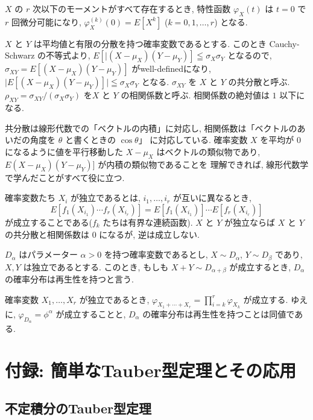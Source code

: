 \documentclass[12pt,twoside]{jarticle}
\theoremstyle{jplain}
\theoremstyle{jplain}
\theoremstyle{jplain}
\numberwithin{theorem}{section}
\numberwithin{equation}{section}
\numberwithin{figure}{section}
\numberwithin{table}{section}
\begin{document}
$X$ の $r$ 次以下のモーメントがすべて存在するとき, 
特性函数 $\varphi_X(t)$ は $t=0$ で $r$ 回微分可能になり, 
$\varphi_X^{(k)}(0)=E[X^k]$ ($k=0,1,\ldots,r$) となる.

$X$ と $Y$ は平均値と有限の分散を持つ確率変数であるとする.
このとき Cauchy-Schwarz の不等式より, 
$E[|(X-\mu_X)(Y-\mu_Y)]\leqq\sigma_X\sigma_Y$ となるので, 
$\sigma_{XY}=E[(X-\mu_X)(Y-\mu_Y)]$ がwell-definedになり, 
$\bigl|E[(X-\mu_X)(Y-\mu_Y)]\bigr|\leqq\sigma_X\sigma_Y$ となる.
$\sigma_{XY}$ を $X$ と $Y$ の共分散と呼ぶ.
$\rho_{XY}=\sigma_{XY}/(\sigma_X\sigma_Y)$ を$X$ と $Y$ の相関係数と呼ぶ.
相関係数の絶対値は $1$ 以下になる.

共分散は線形代数での「ベクトルの内積」に対応し, 
相関係数は「ベクトルのあいだの角度を $\theta$ と書くときの $\cos\theta$」
に対応している.
確率変数 $X$ を平均が $0$ になるように値を平行移動した $X-\mu_X$
はベクトルの類似物であり, $E(X-\mu_X)(Y-\mu_Y)]$ が内積の類似物であることを
理解できれば, 線形代数学で学んだことがすべて役に立つ.

確率変数たち $X_i$ が独立であるとは, 
$i_1,\ldots,i_r$ が互いに異なるとき, 
\[
E[f_1(X_{i_1})\cdots f_r(X_{i_r})]
=
E[f_1(X_{i_1})]\cdots E[f_r(X_{i_r})]
\]
が成立することである($f_k$ たちは有界な連続函数).
$X$ と $Y$ が独立ならば $X$ と $Y$ の共分散と相関係数は $0$ になるが, 
逆は成立しない.

$D_\alpha$ はパラメーター $\alpha>0$ を持つ確率変数であるとし, 
$X\sim D_\alpha$, $Y\sim D_\beta$ であり, $X,Y$ は独立であるとする.
このとき, もしも $X+Y\sim D_{\alpha+\beta}$ が成立するとき, 
$D_\alpha$ の確率分布は再生性を持つと言う.

確率変数 $X_1,\ldots,X_r$ が独立であるとき, 
$\varphi_{X_1+\cdots+X_r}=\prod_{i=k}^r\varphi_{X_k}$ が成立する.
ゆえに, $\varphi_{D_\alpha}=\phi^\alpha$ が成立することと,  
$D_\alpha$ の確率分布は再生性を持つことは同値である.


\section{付録: 簡単なTauber型定理とその応用}
\label{sec:Tauber}

\subsection{不定積分のTauber型定理}
\end{document}
